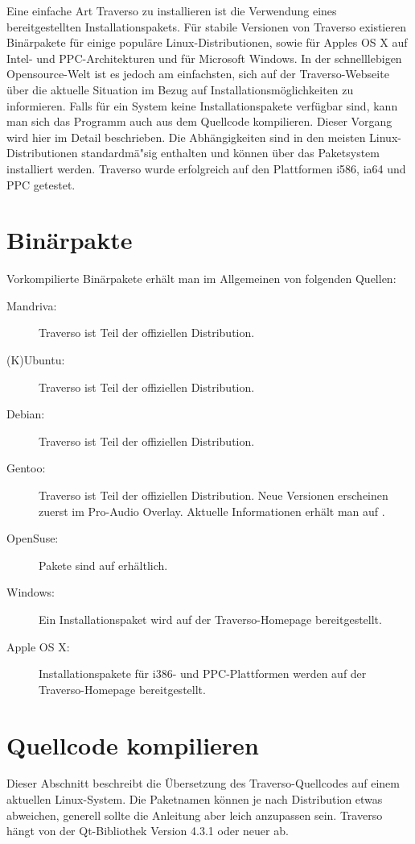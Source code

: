 Eine einfache Art Traverso zu installieren ist die Verwendung eines bereitgestellten Installationspakets. Für stabile Versionen von Traverso existieren Binärpakete für einige populäre Linux-Distributionen, sowie für Apples OS X auf Intel- und PPC-Architekturen und für Microsoft Windows. In der schnelllebigen Opensource-Welt ist es jedoch am einfachsten, sich auf der Traverso-Webseite \cite{trav-hp} über die aktuelle Situation im Bezug auf Installationsmöglichkeiten zu informieren. Falls für ein System keine Installationspakete verfügbar sind, kann man sich das Programm auch aus dem Quellcode kompilieren. Dieser Vorgang wird hier im Detail beschrieben. Die Abhängigkeiten sind in den meisten Linux-Distributionen standardmä"sig enthalten und können über das Paketsystem installiert werden. Traverso wurde erfolgreich auf den Plattformen i586, ia64 und PPC getestet.

\section{Binärpakte}
Vorkompilierte Binärpakete erhält man im Allgemeinen von folgenden Quellen:

\begin{description}
	\item [Mandriva:] Traverso ist Teil der offiziellen Distribution.
	\item [(K)Ubuntu:] Traverso ist Teil der offiziellen Distribution.
	\item [Debian:] Traverso ist Teil der offiziellen Distribution.
	\item [Gentoo:] Traverso ist Teil der offiziellen Distribution. Neue Versionen erscheinen zuerst im Pro-Audio Overlay. Aktuelle Informationen erhält man auf \cite{pro-audio-wiki}.
	\item [OpenSuse:] Pakete sind auf \cite{suse-ref} erhältlich.
	\item [Windows:] Ein Installationspaket wird auf der Traverso-Homepage \cite{trav-hp} bereitgestellt.
	\item [Apple OS X:] Installationspakete für i386- und PPC-Plattformen werden auf der Traverso-Homepage \cite{trav-hp} bereitgestellt.
\end{description}

\section{Quellcode kompilieren}
Dieser Abschnitt beschreibt die Übersetzung des Traverso-Quellcodes auf einem aktuellen Linux-System. Die Paketnamen können je nach Distribution etwas abweichen, generell sollte die Anleitung aber leich anzupassen sein. Traverso hängt von der Qt-Bibliothek Version 4.3.1 oder neuer ab.

